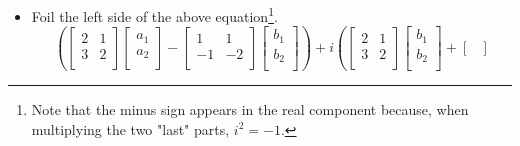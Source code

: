 \documentclass{article}
\begin{document}
\begin{itemize}
\begin{align*}
{        \right)}_x &= \underbrace{\left(
            \begin{bmatrix}
                3\\
                7\\
            \end{bmatrix}
            +i
            \begin{bmatrix}
                6\\
                -1\\
            \end{bmatrix}
        \right)}_b
    \end{align*}
    \item Foil the left side of the above equation\footnote{Note that the minus sign appears in the real component because, when multiplying the two "last" parts, $i^2=-1$.}.
    \begin{equation*}
        \left(
            \begin{bmatrix}
                2 & 1\\
                3 & 2\\
            \end{bmatrix}
            \begin{bmatrix}
                a_1\\
                a_2\\
            \end{bmatrix}
            -
            \begin{bmatrix}
                1 & 1\\
                -1 & -2\\
            \end{bmatrix}
            \begin{bmatrix}
                b_1\\
                b_2\\
            \end{bmatrix}
        \right)+i\left(
            \begin{bmatrix}
                2 & 1\\
                3 & 2\\
            \end{bmatrix}
            \begin{bmatrix}
                b_1\\
                b_2\\
            \end{bmatrix}
            +
            \begin{bmatrix}

\end{bmatrix}
\end{equation*}
\end{itemize}
\end{document}
